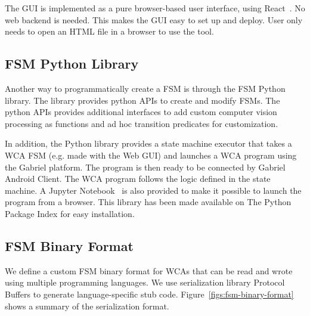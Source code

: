The GUI is implemented as a pure browser-based user interface, using
React~\cite{staff2016react}. No web backend is needed. This makes the GUI easy
to set up and deploy. User only needs to open an HTML file in a browser to 
use the tool.

\subsection{FSM Python Library}

Another way to programmatically create a FSM is through the FSM Python library.
The library provides python APIs to create and modify FSMs. The python APIs
provides additional interfaces to add custom computer vision processing as
functions and ad hoc transition predicates for customization. 

In addition, the Python library provides a state machine executor that takes a
WCA FSM (e.g. made with the Web GUI) and launches a WCA program using the
Gabriel platform. The program is then ready to be connected by Gabriel Android
Client. The WCA program follows the logic defined in the state machine. A
Jupyter Notebook~\cite{kluyver2016jupyter} is also provided to make it possible to launch the program from
a browser. This library has been made available on The Python Package Index for
easy installation.

\subsection{FSM Binary Format}

We define a custom FSM binary format for WCAs that can be read and wrote using
multiple programming languages. We use serialization library Protocol Buffers to
generate language-specific stub code. Figure~\ref{figs:fsm-binary-format} shows
a summary of the serialization format.


